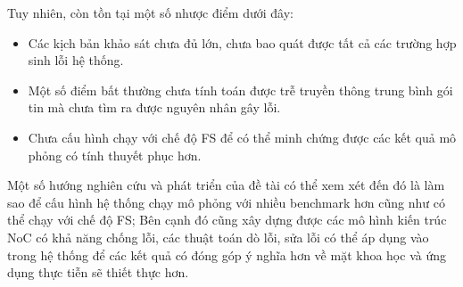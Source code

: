 \documentclass{article}
\begin{document}
Tuy nhiên, còn tồn tại một số nhược điểm dưới đây:
\begin{itemize}
	\item Các kịch bản khảo sát chưa đủ lớn, chưa bao quát được tất cả các trường hợp sinh lỗi hệ thống.
	\item Một số điểm bất thường chưa tính toán được trễ truyền thông trung bình gói tin mà chưa tìm ra được nguyên nhân gây lỗi.
	\item Chưa cấu hình chạy với chế độ FS để có thể minh chứng được các kết quả mô phỏng có tính thuyết phục hơn.
\end{itemize}

Một số hướng nghiên cứu và phát triển của đề tài có thể xem xét đến đó là làm sao để cấu hình hệ thống chạy mô phỏng với nhiều benchmark hơn cũng như có thể chạy với chế độ FS; Bên cạnh đó cũng xây dựng được các mô hình kiến trúc NoC có khả năng chống lỗi, các thuật toán dò lỗi, sửa lỗi có thể áp dụng vào trong hệ thống để các kết quả có đóng góp ý nghĩa hơn về mặt khoa học và ứng dụng thực tiễn sẽ thiết thực hơn.
	\newpage
	
	
	
\end{document}
